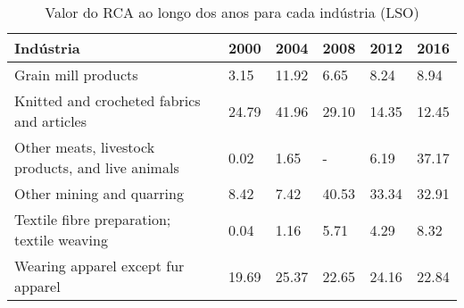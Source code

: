 \begin{table}
\centering
\caption{Valor do RCA ao longo dos anos para cada indústria (LSO)}
\label{tab:ex3-tempo-LSO}
\begin{tabular}{p{6cm}p{1.5cm}p{1.5cm}p{1.5cm}p{1.5cm}p{1.5cm}}
\toprule
                                        Indústria &  2000 &  2004 &  2008 &  2012 &  2016 \\
\midrule
                              Grain mill products &  3.15 & 11.92 &  6.65 &  8.24 &  8.94 \\
       Knitted and crocheted fabrics and articles & 24.79 & 41.96 & 29.10 & 14.35 & 12.45 \\
Other meats, livestock products, and live animals &  0.02 &  1.65 &     - &  6.19 & 37.17 \\
                        Other mining and quarring &  8.42 &  7.42 & 40.53 & 33.34 & 32.91 \\
       Textile fibre preparation; textile weaving &  0.04 &  1.16 &  5.71 &  4.29 &  8.32 \\
               Wearing apparel except fur apparel & 19.69 & 25.37 & 22.65 & 24.16 & 22.84 \\
\bottomrule
\end{tabular}
\end{table}
